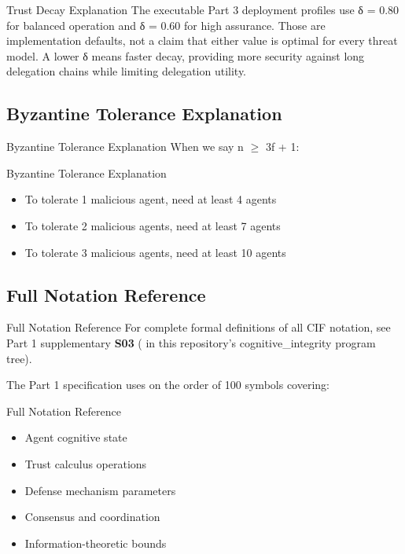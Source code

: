 \documentclass[
  ignorenonframetext,
]{beamer}
\providecommand{\tightlist}{%
  \setlength{\itemsep}{0pt}\setlength{\parskip}{0pt}}
\begin{document}
\begin{frame}[allowframebreaks]{Trust Decay Explanation}
The executable Part 3 deployment profiles use δ = 0.80 for balanced
operation and δ = 0.60 for high assurance. Those are implementation
defaults, not a claim that either value is optimal for every threat
model. A lower δ means faster decay, providing more security against
long delegation chains while limiting delegation utility.
\end{frame}

\subsection{Byzantine Tolerance
Explanation}\label{byzantine-tolerance-explanation}

\begin{frame}[allowframebreaks]{Byzantine Tolerance Explanation}
When we say n \ensuremath{\ge} 3f + 1:

\end{frame}

\begin{frame}[allowframebreaks]{Byzantine Tolerance Explanation}
\begin{itemize}
\tightlist
\item
  To tolerate 1 malicious agent, need at least 4 agents
\item
  To tolerate 2 malicious agents, need at least 7 agents
\item
  To tolerate 3 malicious agents, need at least 10 agents
\end{itemize}
\end{frame}

\subsection{Full Notation Reference}\label{full-notation-reference}

\begin{frame}{Full Notation Reference}
For complete formal definitions of all CIF notation, see Part 1
supplementary \textbf{S03}
( in
this repository's cognitive\_integrity program tree).

The Part 1 specification uses on the order of 100 symbols covering:

\end{frame}

\begin{frame}{Full Notation Reference}
\begin{itemize}
\tightlist
\item
  Agent cognitive state
\item
  Trust calculus operations
\item
  Defense mechanism parameters
\item
  Consensus and coordination
\item
  Information-theoretic bounds
\end{itemize}
\end{frame}
\end{document}
